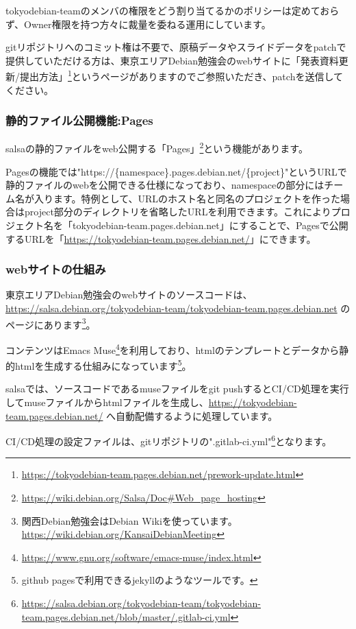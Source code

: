 \documentclass[mingoth,a4paper]{jsarticle}
\begin{document}
tokyodebian-teamのメンバの権限をどう割り当てるかのポリシーは定めておらず、Owner権限を持つ方々に裁量を委ねる運用にしています。


gitリポジトリへのコミット権は不要で、原稿データやスライドデータをpatchで提供していただける方は、東京エリアDebian勉強会のwebサイトに「発表資料更新/提出方法」\footnote{\url{https://tokyodebian-team.pages.debian.net/prework-update.html}}というページがありますのでご参照いただき、patchを送信してください。


\subsubsection{静的ファイル公開機能:Pages}

salsaの静的ファイルをweb公開する「Pages」\footnote{\url{https://wiki.debian.org/Salsa/Doc\#Web_page_hosting}}という機能があります。


Pagesの機能では"https://\{namespace\}.pages.debian.net/\{project\}"というURLで静的ファイルのwebを公開できる仕様になっており、namespaceの部分にはチーム名が入ります。特例として、URLのホスト名と同名のプロジェクトを作った場合はproject部分のディレクトリを省略したURLを利用できます。これによりプロジェクト名を「tokyodebian-team.pages.debian.net」にすることで、Pagesで公開するURLを「\url{https://tokyodebian-team.pages.debian.net/}」にできます。


\subsubsection{webサイトの仕組み}

東京エリアDebian勉強会のwebサイトのソースコードは、\url{https://salsa.debian.org/tokyodebian-team/tokyodebian-team.pages.debian.net} のページにあります\footnote{関西Debian勉強会はDebian Wikiを使っています。\url{https://wiki.debian.org/KansaiDebianMeeting}}。


コンテンツはEmacs Muse\footnote{\url{https://www.gnu.org/software/emacs-muse/index.html}}を利用しており、htmlのテンプレートとデータから静的htmlを生成する仕組みになっています\footnote{github pagesで利用できるjekyllのようなツールです。}。


salsaでは、ソースコードであるmuseファイルをgit pushするとCI/CD処理を実行してmuseファイルからhtmlファイルを生成し、\url{https://tokyodebian-team.pages.debian.net/} へ自動配備するように処理しています。


CI/CD処理の設定ファイルは、gitリポジトリの".gitlab-ci.yml"\footnote{\url{https://salsa.debian.org/tokyodebian-team/tokyodebian-team.pages.debian.net/blob/master/.gitlab-ci.yml}}となります。
\end{document}
